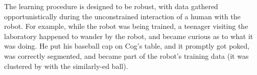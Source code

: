 The learning procedure is designed to be robust, with data gathered
opportunistically during the unconstrained interaction of a human with
the robot.  For example, while the robot was being trained, a teenager
visiting the laboratory happened to wander by the robot, and became
curious as to what it was doing.  He put his baseball cap on Cog's
table, and it promptly got poked, was correctly segmented, and became
part of the robot's training data (it was clustered by \ahhcolor{} with
the similarly-\ahhcolor{}ed ball).




\fi

